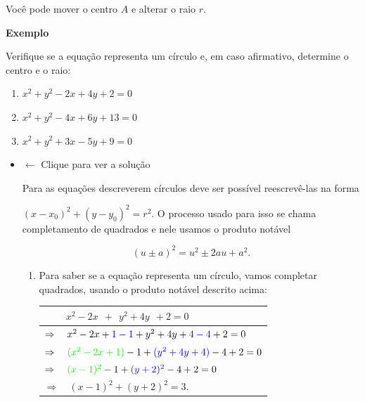 \documentclass[
  brazilian,
  letterpaper,
  DIV=11,
  numbers=noendperiod]{scrreprt}
\newcounter{none} %
\providecommand{\tightlist}{%
  \setlength{\itemsep}{0pt}\setlength{\parskip}{0pt}}
\theoremstyle{definition}
\theoremstyle{plain}
\theoremstyle{definition}
\theoremstyle{remark}
\begin{document}
Você pode mover o centro \(A\) e alterar o raio \(r\).

\textbf{Exemplo}

Verifique se a equação representa um círculo e, em caso afirmativo,
determine o centro e o raio:

\begin{enumerate}
\def\labelenumi{\arabic{enumi}.}
\tightlist
\item
  \(x^2+y^2-2x+4y+2=0\)
\item
  \(x^2+y^2-4x+6y+13=0\)
\item
  \(x^2+y^2+3x-5y+9=0\)
\end{enumerate}

\begin{itemize}
\item
  \(\leftarrow\) Clique para ver a solução

  Para as equações descreverem círculos deve ser possível reescrevê-las
  na forma

  \((x-x_0)^2+(y-y_0)^2=r^2\). O processo usado para isso se chama
  completamento de quadrados e nele usamos o produto notável

  \[
     (u \pm a)^2 = u^2 \pm 2a u +a^2.
    \]

  \begin{enumerate}
  \def\labelenumi{\arabic{enumi}.}
  \item
    Para saber se a equação representa um círculo, vamos completar
    quadrados, usando o produto notável descrito acima:

    {\def\LTcaptype{none} %
    \begin{longtable}[]{@{}
      >{\raggedright\arraybackslash}p{}@{}}
    \toprule\noalign{}
    \begin{minipage}[b]{\linewidth}\raggedright
    \(\qquad \ x^2-2x\ \ + \ \ y^2+4y \ \ +2=0\)
    \end{minipage} \\
    \midrule\noalign{}
    \endhead
    \bottomrule\noalign{}
    \endlastfoot
    \(\Rightarrow \quad x^2-2x+{\color{blue}1-1}+y^2+4y+{\color{blue}4-4}+2=0\) \\
    \(\Rightarrow \quad{\color{green}(x^2-2x+1)}-1+{\color{blue}(y^2+4y+4)}-4+2=0\) \\
    \(\Rightarrow \quad{\color{green}(x-1)^2}-1+{\color{blue}(y+2)^2}-4+2=0\) \\
    \(\Rightarrow \quad (x-1)^2+(y+2)^2=3\). \\
    \end{longtable}
    }


\end{enumerate}
\end{itemize}
\end{document}
